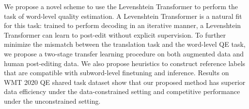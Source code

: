 We propose a novel scheme to use the \mbox{Levenshtein} Transformer to perform the task of word-level quality estimation. A Levenshtein Transformer is a natural fit for this task: trained to perform decoding in an iterative manner, a Levenshtein Transformer can learn to post-edit without explicit supervision. To further minimize the mismatch between the translation task and the word-level QE task, we propose a two-stage transfer learning procedure on both augmented data and human post-editing data. We also propose heuristics to construct reference labels that are compatible with subword-level finetuning and inference. Results on WMT 2020 QE shared task dataset show that our proposed method has superior data efficiency under the data-constrained setting and competitive performance under the unconstrained setting.
